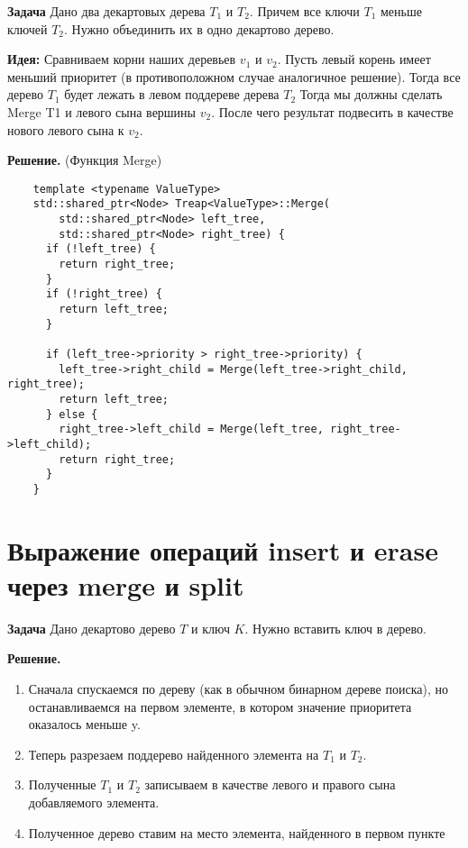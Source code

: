 \textbf{Задача} Дано два декартовых дерева $T_1$ и $T_2$. Причем все ключи $T_1$ меньше ключей $T_2$. Нужно объединить их в одно декартово дерево.
\newline

\textbf{Идея:} Сравниваем корни наших деревьев $v_1$ и $v_2$. Пусть левый корень имеет меньший приоритет (в противоположном случае аналогичное решение). Тогда все дерево $T_1$ будет лежать в левом поддереве дерева $T_2$ Тогда мы должны сделать Merge T1 и левого сына вершины $v_2$. После чего результат подвесить в качестве нового левого сына к $v_2$.
\newline

\textbf{Решение.} (Функция Merge)
\begin{lstlisting}
    template <typename ValueType>
    std::shared_ptr<Node> Treap<ValueType>::Merge(
        std::shared_ptr<Node> left_tree,
        std::shared_ptr<Node> right_tree) {
      if (!left_tree) {
        return right_tree;
      }
      if (!right_tree) {
        return left_tree;
      }
    
      if (left_tree->priority > right_tree->priority) {
        left_tree->right_child = Merge(left_tree->right_child, right_tree);
        return left_tree;
      } else {
        right_tree->left_child = Merge(left_tree, right_tree->left_child);
        return right_tree;
      }
    }
\end{lstlisting}

\setcounter{section}{56}
\section{Выражение операций insert и erase через merge и split}

\textbf{Задача} Дано декартово дерево $T$ и ключ $K$. Нужно вставить ключ в дерево.

\textbf{Решение.}
\begin{enumerate}
    \item Сначала спускаемся по дереву (как в обычном бинарном дереве поиска), но останавливаемся на первом элементе, в котором значение приоритета оказалось меньше y.
    \item Теперь разрезаем поддерево найденного элемента на $T_1$ и $T_2$.
    \item Полученные $T_1$ и $T_2$ записываем в качестве левого и правого сына добавляемого элемента.
    \item Полученное дерево ставим на место элемента, найденного в первом пункте
\end{enumerate}

